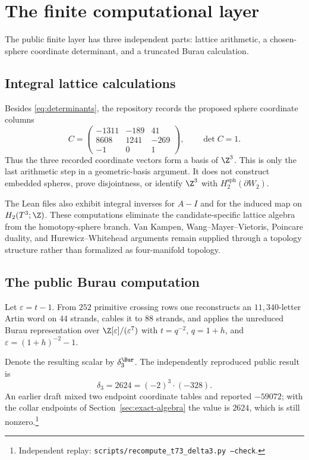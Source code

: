 \section{The finite computational layer}

The public finite layer has three independent parts: lattice arithmetic, a
chosen-sphere coordinate determinant, and a truncated Burau calculation.

\subsection{Integral lattice calculations}

Besides \eqref{eq:determinants}, the repository records the proposed sphere
coordinate columns
\begin{equation}\label{eq:spherecols}
C=\begin{pmatrix}
-1311&-189&41\\
8608&1241&-269\\
-1&0&1
\end{pmatrix},
\qquad \det C=1.
\end{equation}
Thus the three recorded coordinate vectors form a basis of $\Z^3$.  This is
only the last arithmetic step in a geometric-basis argument.  It does not
construct embedded spheres, prove disjointness, or identify $\Z^3$ with
$H_2^{\mathrm{sph}}(\partial W_2)$.

The Lean files also exhibit integral inverses for $A-I$ and for the induced
map on $H_2(T^3;\Z)$.  These computations eliminate the candidate-specific
lattice algebra from the homotopy-sphere branch.  Van Kampen,
Wang--Mayer--Vietoris, Poincare duality, and Hurewicz--Whitehead arguments
remain supplied through a topology structure rather than formalized as
four-manifold topology.

\subsection{The public Burau computation}

Let $\varepsilon=t-1$.  From $252$ primitive crossing rows one reconstructs
an $11{,}340$-letter Artin word on $44$ strands, cables it to $88$ strands,
and applies the unreduced Burau representation over
$\Z[\varepsilon]/(\varepsilon^7)$ with $t=q^{-2}$, $q=1+h$, and
$\varepsilon=(1+h)^{-2}-1$.

Denote the resulting scalar by $\delta_3^{\Bur}$.  The independently
reproduced public result is
\begin{equation}\label{eq:burau}
\delta_3=2624=(-2)^3\cdot(-328).
\end{equation}
An earlier draft mixed two endpoint coordinate tables and reported
$-59072$; with the collar endpoints of Section~\ref{sec:exact-algebra} the
value is $2624$, which is still nonzero.\footnote{Independent replay:
\texttt{scripts/recompute\_t73\_delta3.py --check}.}

